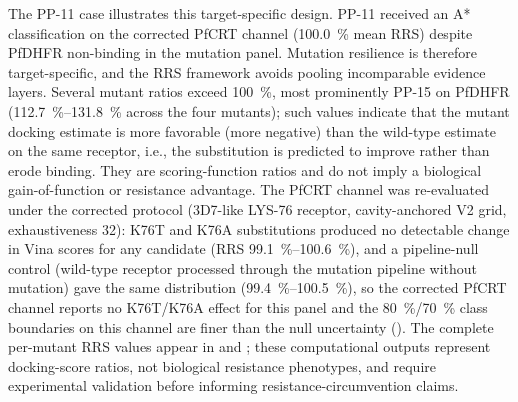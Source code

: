 \documentclass[journal=jcisd8,manuscript=article]{achemso}
\begin{document}
The PP-11 case illustrates this target-specific design. PP-11 received an A* classification on the corrected PfCRT channel (\qty{100.0}{\percent} mean RRS) despite PfDHFR non-binding in the mutation panel. Mutation resilience is therefore target-specific, and the RRS framework avoids pooling incomparable evidence layers. Several mutant ratios exceed \qty{100}{\percent}, most prominently PP-15 on PfDHFR (\qtyrange{112.7}{131.8}{\percent} across the four mutants); such values indicate that the mutant docking estimate is more favorable (more negative) than the wild-type estimate on the same receptor, i.e., the substitution is predicted to improve rather than erode binding. They are scoring-function ratios and do not imply a biological gain-of-function or resistance advantage. The PfCRT channel was re-evaluated under the corrected protocol (3D7-like LYS-76 receptor, cavity-anchored V2 grid, exhaustiveness \num{32}): K76T and K76A substitutions produced no detectable change in Vina scores for any candidate (RRS \qtyrange{99.1}{100.6}{\percent}), and a pipeline-null control (wild-type receptor processed through the mutation pipeline without mutation) gave the same distribution (\qtyrange{99.4}{100.5}{\percent}), so the corrected PfCRT channel reports no K76T/K76A effect for this panel and the \qty{80}{\percent}/\qty{70}{\percent} class boundaries on this channel are finer than the null uncertainty (). The complete per-mutant RRS values appear in  and ; these computational outputs represent docking-score ratios, not biological resistance phenotypes, and require experimental validation before informing resistance-circumvention claims.
\end{document}
